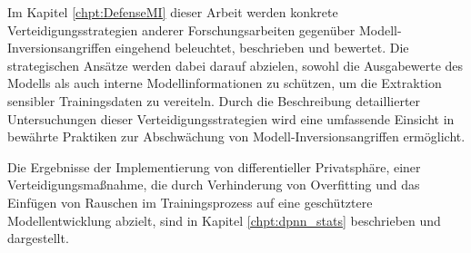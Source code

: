 Im Kapitel \ref{chpt:DefenseMI} dieser Arbeit werden konkrete Verteidigungsstrategien anderer Forschungsarbeiten gegenüber Modell-Inversionsangriffen eingehend beleuchtet, beschrieben und bewertet. Die strategischen Ansätze werden dabei darauf abzielen, sowohl die Ausgabewerte des Modells als auch interne Modellinformationen zu schützen, um die Extraktion sensibler Trainingsdaten zu vereiteln. Durch die Beschreibung detaillierter Untersuchungen dieser Verteidigungsstrategien wird eine umfassende Einsicht in bewährte Praktiken zur Abschwächung von Modell-Inversionsangriffen ermöglicht.

Die Ergebnisse der Implementierung von differentieller Privatsphäre, einer Verteidigungsmaßnahme, die durch Verhinderung von Overfitting und das Einfügen von Rauschen im Trainingsprozess auf eine geschütztere Modellentwicklung abzielt, sind in Kapitel \ref{chpt:dpnn_stats} beschrieben und dargestellt.
